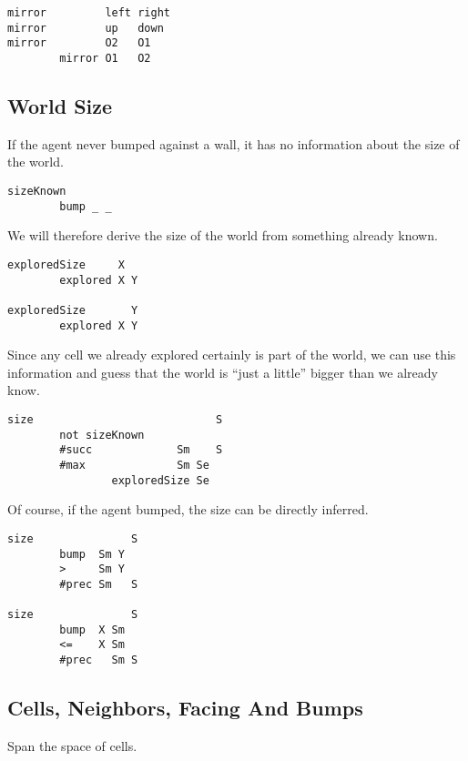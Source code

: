 \begin{verbatim}
mirror         left right
mirror         up   down
mirror         O2   O1
        mirror O1   O2
\end{verbatim}

\hypertarget{world-size}{%
\subsection{World Size}\label{world-size}}

If the agent never bumped against a wall, it has no information about
the size of the world.

\begin{verbatim}
sizeKnown
        bump _ _
\end{verbatim}

We will therefore derive the size of the world from something already
known.

\begin{verbatim}
exploredSize     X
        explored X Y

exploredSize       Y
        explored X Y
\end{verbatim}

Since any cell we already explored certainly is part of the world, we
can use this information and guess that the world is ``just a little''
bigger than we already know.

\begin{verbatim}
size                            S
        not sizeKnown
        #succ             Sm    S
        #max              Sm Se
                exploredSize Se
\end{verbatim}

Of course, if the agent bumped, the size can be directly inferred.

\begin{verbatim}
size               S
        bump  Sm Y
        >     Sm Y
        #prec Sm   S

size               S
        bump  X Sm
        <=    X Sm
        #prec   Sm S
\end{verbatim}

\hypertarget{cells-neighbors-facing-and-bumps}{%
\subsection{Cells, Neighbors, Facing And
Bumps}\label{cells-neighbors-facing-and-bumps}}

Span the space of cells.

